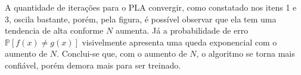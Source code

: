 \begin{enumerate}
    A quantidade de iterações para o PLA convergir, como constatado nos itens 1 e 3, oscila bastante, porém, pela figura, é possível observar que ela tem uma tendencia de alta conforme $N$ aumenta. Já a probabilidade de erro $\mathbb{P}[f(x) \neq g(x)]$ visivelmente apresenta uma queda exponencial com o aumento de $N$. Conclui-se que, com o aumento de $N$, o algoritmo se torna mais confiável, porém demora mais para ser treinado.
    
    
\end{enumerate}